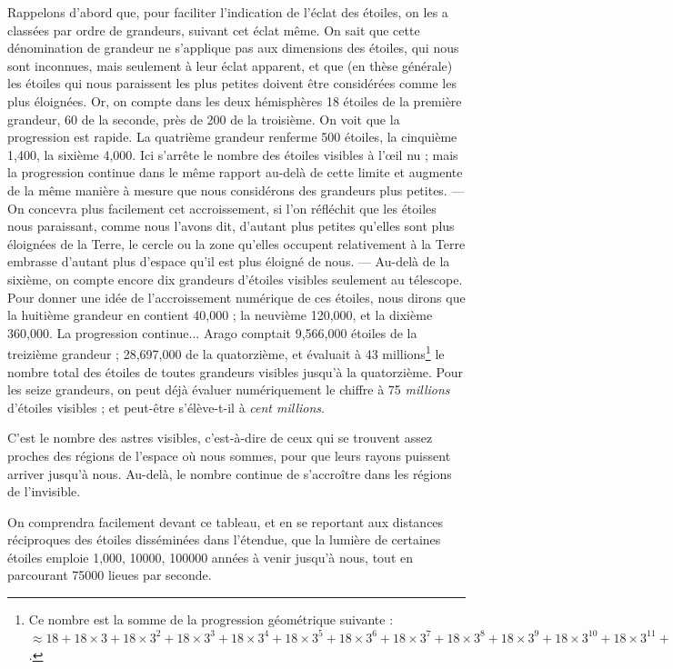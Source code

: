 \documentclass[a4paper, 11pt, oneside, landscape]{article}
\begin{document}
Rappelons d'abord que, pour faciliter l'indication de l'éclat des étoiles, on les a classées par ordre de grandeurs, suivant cet éclat même. On sait que cette dénomination de grandeur ne s'applique pas aux dimensions des étoiles, qui nous sont inconnues, mais seulement à leur éclat apparent, et que (en thèse générale) les étoiles qui nous paraissent les plus petites doivent être considérées comme les plus éloignées. Or, on compte dans les deux hémisphères 18 étoiles de la première grandeur, 60 de la seconde, près de 200 de la troisième. On voit que la progression est rapide. La quatrième grandeur renferme 500 étoiles, la cinquième 1,400, la sixième 4,000. Ici s'arrête le nombre des étoiles visibles à l'œil nu ; mais la progression continue dans le même rapport au-delà de cette limite et augmente de la même manière à mesure que nous considérons des grandeurs plus petites. --- On concevra plus facilement cet accroissement, si l'on réfléchit que les étoiles nous paraissant, comme nous l'avons dit, d'autant plus petites qu'elles sont plus éloignées de la Terre, le cercle ou la zone qu'elles occupent relativement à la Terre embrasse d'autant plus d'espace qu'il est plus éloigné de nous. --- Au-delà de la sixième, on compte encore dix grandeurs d'étoiles visibles seulement au télescope. Pour donner une idée de l'accroissement numérique de ces étoiles, nous dirons que la huitième grandeur en contient 40,000 ; la neuvième 120,000, et la dixième 360,000. La progression continue... Arago comptait 9,566,000 étoiles de la treizième grandeur ; 28,697,000 de la quatorzième, et évaluait à 43 millions\footnote{Ce nombre est la somme de la progression géométrique suivante : $\approx 18 + 18 \times 3 + 18 \times 3^2 + 18 \times 3^3 + 18 \times 3^4 + 18 \times 3^5 + 18 \times 3^6 + 18 \times 3^7 + 18 \times 3^8 + 18 \times 3^9 + 18 \times 3^{10} + 18 \times 3^{11} + 18 \times 3^{12} + 18 \times 3^{13}$.} le nombre total des étoiles de toutes grandeurs visibles jusqu'à la quatorzième. Pour les seize grandeurs, on peut déjà évaluer numériquement le chiffre à 75 \emph{millions} d'étoiles visibles ; et peut-être s'élève-t-il à \emph{cent millions}.

C'est le nombre des astres visibles, c'est-à-dire de ceux qui se trouvent assez proches des régions de l'espace où nous sommes, pour que leurs rayons puissent arriver jusqu'à nous. Au-delà, le nombre continue de s'accroître dans les régions de l'invisible.

On comprendra facilement devant ce tableau, et en se reportant aux distances réciproques des étoiles disséminées dans l'étendue, que la lumière de certaines étoiles emploie 1,000, 10000, 100000 années à venir jusqu'à nous, tout en parcourant 75000 lieues par seconde.
\end{document}
